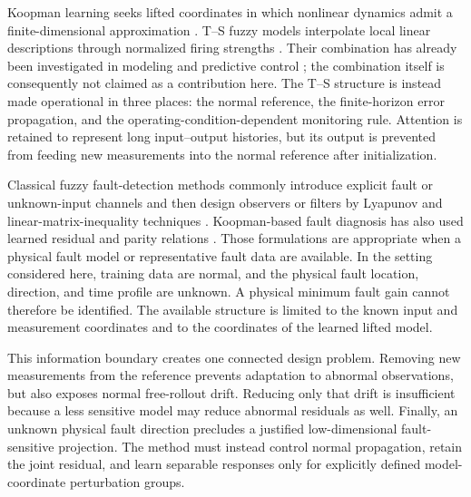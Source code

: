 \documentclass[journal]{IEEEtran}
\newcommand{\1}{\bm 1}
\begin{document}
Koopman learning seeks lifted coordinates in which nonlinear dynamics admit a
finite-dimensional approximation \cite{brunton2016,lusch2018}. T--S fuzzy
models interpolate local linear descriptions through normalized firing
strengths \cite{takagi1985,tanaka2001,lam2018}. Their combination has already
been investigated in modeling and predictive control \cite{hu2026}; the
combination itself is consequently not claimed as a contribution here. The
T--S structure is instead made operational in three places: the normal
reference, the finite-horizon error propagation, and the
operating-condition-dependent monitoring rule. Attention is retained to
represent long input--output histories, but its output is prevented from
feeding new measurements into the normal reference after initialization.

Classical fuzzy fault-detection methods commonly introduce explicit fault or
unknown-input channels and then design observers or filters by Lyapunov and
linear-matrix-inequality techniques
\cite{nguang2007,yang2011,thumati2014,zhao2020,ran2022}. Koopman-based fault
diagnosis has also used learned residual and parity relations
\cite{bakhtiaridoust2023,irani2024}. Those formulations are appropriate when a
physical fault model or representative fault data are available. In the
setting considered here, training data are normal, and the physical fault
location, direction, and time profile are unknown. A physical minimum fault
gain cannot therefore be identified. The available structure is limited to
the known input and measurement coordinates and to the coordinates of the
learned lifted model.

This information boundary creates one connected design problem. Removing new
measurements from the reference prevents adaptation to abnormal observations,
but also exposes normal free-rollout drift. Reducing only that drift is
insufficient because a less sensitive model may reduce abnormal residuals as
well. Finally, an unknown physical fault direction precludes a justified
low-dimensional fault-sensitive projection. The method must instead control
normal propagation, retain the joint residual, and learn separable responses
only for explicitly defined model-coordinate perturbation groups.
\end{document}
